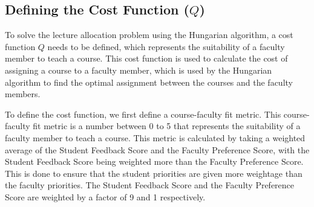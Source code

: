 

\subsection{Defining the Cost Function (\texorpdfstring{$Q$}{Q})}
\label{sec:defining_the_cost_function}

To solve the lecture allocation problem using the Hungarian algorithm, a cost function \(Q\) needs to be defined, which represents the suitability of a faculty member to teach a course. This cost function is used to calculate the cost of assigning a course to a faculty member, which is used by the Hungarian algorithm to find the optimal assignment between the courses and the faculty members.

To define the cost function, we first define a course-faculty fit metric. This course-faculty fit metric is a number between 0 to 5 that represents the suitability of a faculty member to teach a course. This metric is calculated by taking a weighted average of the Student Feedback Score and the Faculty Preference Score, with the Student Feedback Score being weighted more than the Faculty Preference Score. This is done to ensure that the student priorities are given more weightage than the faculty priorities. The Student Feedback Score and the Faculty Preference Score are weighted by a factor of 9 and 1 respectively.

